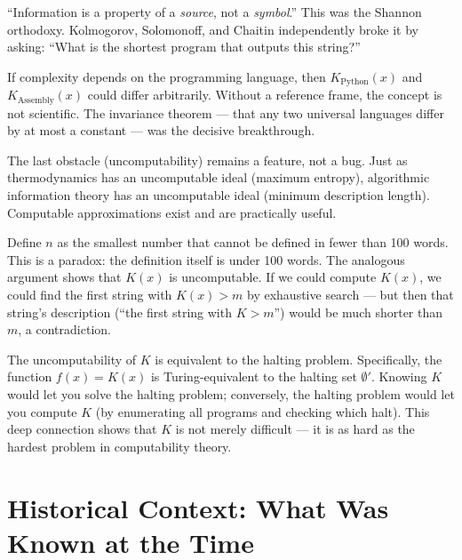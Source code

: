 ``Information is a property of a \emph{source}, not a \emph{symbol}.'' This was the Shannon orthodoxy. Kolmogorov, Solomonoff, and Chaitin independently broke it by asking: ``What is the shortest program that outputs this string?''

If complexity depends on the programming language, then $K_{\text{Python}}(x)$ and $K_{\text{Assembly}}(x)$ could differ arbitrarily. Without a reference frame, the concept is not scientific. The invariance theorem --- that any two universal languages differ by at most a constant --- was the decisive breakthrough.

The last obstacle (uncomputability) remains a feature, not a bug. Just as thermodynamics has an uncomputable ideal (maximum entropy), algorithmic information theory has an uncomputable ideal (minimum description length). Computable approximations exist and are practically useful.

Define $n$ as the smallest number that cannot be defined in fewer than 100 words. This is a paradox: the definition itself is under 100 words. The analogous argument shows that $K(x)$ is uncomputable. If we could compute $K(x)$, we could find the first string with $K(x) > m$ by exhaustive search --- but then that string's description (``the first string with $K > m$'') would be much shorter than $m$, a contradiction.

The uncomputability of $K$ is equivalent to the halting problem. Specifically, the function $f(x) = K(x)$ is Turing-equivalent to the halting set $\emptyset'$. Knowing $K$ would let you solve the halting problem; conversely, the halting problem would let you compute $K$ (by enumerating all programs and checking which halt). This deep connection shows that $K$ is not merely difficult --- it is as hard as the hardest problem in computability theory.

\section{Historical Context: What Was Known at the Time}
\label{sec:kolmogorov:context}

